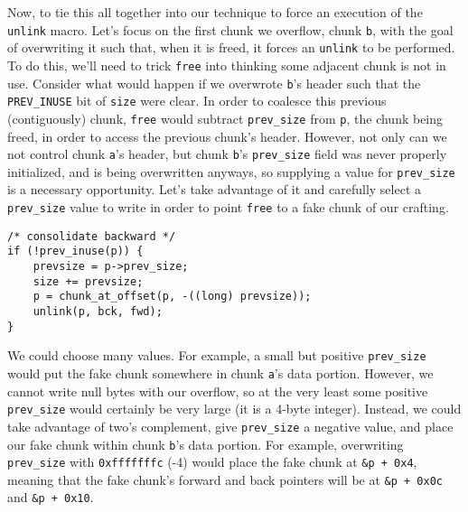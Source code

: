 Now, to tie this all together into our technique to force an execution
of the \texttt{unlink} macro. Let's focus on the first chunk we overflow,
chunk \texttt{b}, with the goal of overwriting it such that, when it is
freed, it forces an \texttt{unlink} to be performed. To do this, we'll
need to trick \texttt{free} into thinking some adjacent chunk is
not in use. Consider what would happen if we overwrote \texttt{b}'s
header such that the \texttt{PREV\_INUSE} bit of \texttt{size}
were clear. In order to coalesce this previous (contiguously) chunk,
\texttt{free} would subtract \texttt{prev\_size} from \texttt{p},
the chunk being freed, in order to access the previous chunk's header.
However, not only can we not control chunk \texttt{a}'s header, but
chunk \texttt{b}'s \texttt{prev\_size} field was never properly
initialized, and is being overwritten anyways, so supplying a
value for \texttt{prev\_size} is a necessary opportunity. Let's
take advantage of it and carefully select a \texttt{prev\_size}
value to write in order to point \texttt{free} to a fake chunk of
our crafting.

\begin{lstlisting}
/* consolidate backward */
if (!prev_inuse(p)) {
	prevsize = p->prev_size;
	size += prevsize;
	p = chunk_at_offset(p, -((long) prevsize));
	unlink(p, bck, fwd);
}
\end{lstlisting}

We could choose many values. For example, a small but positive \texttt{prev\_size}
would put the fake chunk somewhere in chunk \texttt{a}'s data portion.
However, we cannot write null bytes with our overflow, so at the very least
some positive \texttt{prev\_size} would certainly be very large (it is a 4-byte integer).
Instead, we could take advantage of two's complement, give \texttt{prev\_size} a negative value, and place our
fake chunk within chunk \texttt{b}'s data portion. For example,
overwriting \texttt{prev\_size} with \texttt{0xfffffffc} (-4) would
place the fake chunk at \texttt{\&p + 0x4}, meaning that the fake chunk's
forward and back pointers will be at \texttt{\&p + 0x0c} and \texttt{\&p + 0x10}.\\

